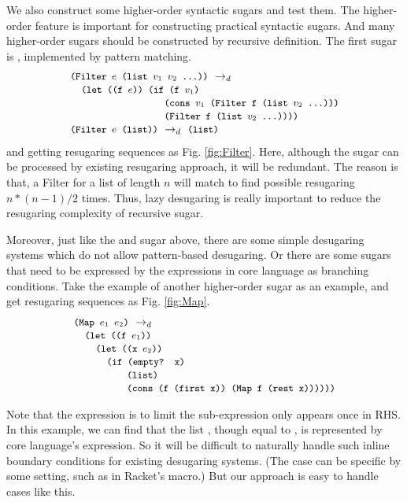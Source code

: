 We also construct some higher-order syntactic sugars and test them. The higher-order feature is important for constructing practical syntactic sugars. And many higher-order sugars should be constructed by recursive definition. The first sugar is , implemented by pattern matching.
\[\begin{array}{l}
\texttt{\small(Filter $e$ (list $v_1$ $v_2$ ...))} ~\rightarrow_d~\\
\quad
\texttt{\small (let ((f $e$)) (if (f $v_1$)}\\
\qquad\qquad\qquad\qquad\;\;\texttt{\small (cons $v_1$ (Filter f (list $v_2$ ...)))}\\
\qquad\qquad\qquad\qquad\;\;\texttt{\small (Filter f (list $v_2$ ...))))}\\

\texttt{\small(Filter $e$ (list))} ~\rightarrow_d~ \texttt{\small(list)}
\end{array}\]
and getting resugaring sequences as Fig.  \ref{fig:Filter}.
Here, although the sugar can be processed by existing resugaring approach, it will be redundant. The reason is that, a Filter for a list of length $n$ will match to find possible resugaring $n*(n-1)/2$ times. Thus, lazy desugaring is really important to reduce the resugaring complexity of recursive sugar.

Moreover, just like the  and  sugar above, there are some simple desugaring systems which do not allow pattern-based desugaring. Or there are some sugars that need to be expressed by the expressions in core language as branching conditions. Take the example of another higher-order sugar  as an example, and get resugaring sequences as Fig.  \ref{fig:Map}.
\[
\begin{array}{l}
\texttt{\small(Map $e_1$ $e_2$)} ~\rightarrow_d~\\
\quad\texttt{\small (let ((f $e_1$))}\\
\qquad\texttt{\small(let ((x $e_2$))}\\
\qquad\quad

\texttt{\small(if (empty? x)}\\
\qquad\qquad\;\;\;\texttt{\small(list)}\\
\qquad\qquad\;\;\;\texttt{\small(cons (f (first x)) (Map f (rest x))))))}


\end{array}
\]



Note that the  expression is to limit the sub-expression only appears once in RHS. In this example, we can find that the list , though equal to , is represented by core language's expression. So it will be difficult to naturally handle such inline boundary conditions for existing desugaring systems. (The case can be specific by some setting, such as  in Racket's macro.) But our approach is easy to handle cases like this. 

